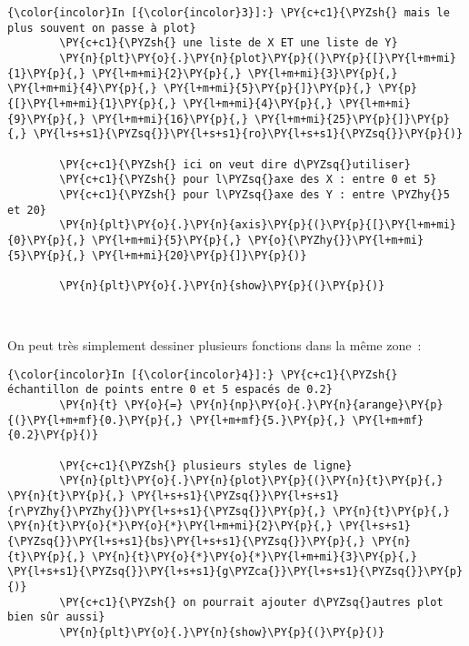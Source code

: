     \begin{Verbatim}[commandchars=\\\{\}]
{\color{incolor}In [{\color{incolor}3}]:} \PY{c+c1}{\PYZsh{} mais le plus souvent on passe à plot}
        \PY{c+c1}{\PYZsh{} une liste de X ET une liste de Y}
        \PY{n}{plt}\PY{o}{.}\PY{n}{plot}\PY{p}{(}\PY{p}{[}\PY{l+m+mi}{1}\PY{p}{,} \PY{l+m+mi}{2}\PY{p}{,} \PY{l+m+mi}{3}\PY{p}{,} \PY{l+m+mi}{4}\PY{p}{,} \PY{l+m+mi}{5}\PY{p}{]}\PY{p}{,} \PY{p}{[}\PY{l+m+mi}{1}\PY{p}{,} \PY{l+m+mi}{4}\PY{p}{,} \PY{l+m+mi}{9}\PY{p}{,} \PY{l+m+mi}{16}\PY{p}{,} \PY{l+m+mi}{25}\PY{p}{]}\PY{p}{,} \PY{l+s+s1}{\PYZsq{}}\PY{l+s+s1}{ro}\PY{l+s+s1}{\PYZsq{}}\PY{p}{)}
        
        \PY{c+c1}{\PYZsh{} ici on veut dire d\PYZsq{}utiliser}
        \PY{c+c1}{\PYZsh{} pour l\PYZsq{}axe des X : entre 0 et 5}
        \PY{c+c1}{\PYZsh{} pour l\PYZsq{}axe des Y : entre \PYZhy{}5 et 20}
        \PY{n}{plt}\PY{o}{.}\PY{n}{axis}\PY{p}{(}\PY{p}{[}\PY{l+m+mi}{0}\PY{p}{,} \PY{l+m+mi}{5}\PY{p}{,} \PY{o}{\PYZhy{}}\PY{l+m+mi}{5}\PY{p}{,} \PY{l+m+mi}{20}\PY{p}{]}\PY{p}{)}
        
        \PY{n}{plt}\PY{o}{.}\PY{n}{show}\PY{p}{(}\PY{p}{)}
\end{Verbatim}


    \begin{center}
    \end{center}
    { \hspace*{\fill} \\}
    
    On peut très simplement dessiner plusieurs fonctions dans la même zone~:

    \begin{Verbatim}[commandchars=\\\{\}]
{\color{incolor}In [{\color{incolor}4}]:} \PY{c+c1}{\PYZsh{} échantillon de points entre 0 et 5 espacés de 0.2}
        \PY{n}{t} \PY{o}{=} \PY{n}{np}\PY{o}{.}\PY{n}{arange}\PY{p}{(}\PY{l+m+mf}{0.}\PY{p}{,} \PY{l+m+mf}{5.}\PY{p}{,} \PY{l+m+mf}{0.2}\PY{p}{)}
        
        \PY{c+c1}{\PYZsh{} plusieurs styles de ligne}
        \PY{n}{plt}\PY{o}{.}\PY{n}{plot}\PY{p}{(}\PY{n}{t}\PY{p}{,} \PY{n}{t}\PY{p}{,} \PY{l+s+s1}{\PYZsq{}}\PY{l+s+s1}{r\PYZhy{}\PYZhy{}}\PY{l+s+s1}{\PYZsq{}}\PY{p}{,} \PY{n}{t}\PY{p}{,} \PY{n}{t}\PY{o}{*}\PY{o}{*}\PY{l+m+mi}{2}\PY{p}{,} \PY{l+s+s1}{\PYZsq{}}\PY{l+s+s1}{bs}\PY{l+s+s1}{\PYZsq{}}\PY{p}{,} \PY{n}{t}\PY{p}{,} \PY{n}{t}\PY{o}{*}\PY{o}{*}\PY{l+m+mi}{3}\PY{p}{,} \PY{l+s+s1}{\PYZsq{}}\PY{l+s+s1}{g\PYZca{}}\PY{l+s+s1}{\PYZsq{}}\PY{p}{)}
        \PY{c+c1}{\PYZsh{} on pourrait ajouter d\PYZsq{}autres plot bien sûr aussi}
        \PY{n}{plt}\PY{o}{.}\PY{n}{show}\PY{p}{(}\PY{p}{)}
\end{Verbatim}


